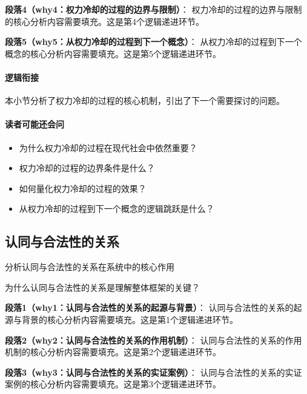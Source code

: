 \documentclass[../main.tex]{subfiles}
\begin{document}
\textbf{段落4（why4：权力冷却的过程的边界与限制）}：
权力冷却的过程的边界与限制的核心分析内容需要填充。这是第4个逻辑递进环节。


\textbf{段落5（why5：从权力冷却的过程到下一个概念）}：
从权力冷却的过程到下一个概念的核心分析内容需要填充。这是第5个逻辑递进环节。


\paragraph*{逻辑衔接}
本小节分析了权力冷却的过程的核心机制，引出了下一个需要探讨的问题。

\paragraph*{读者可能还会问}
\begin{itemize}
\item 为什么权力冷却的过程在现代社会中依然重要？
\item 权力冷却的过程的边界条件是什么？
\item 如何量化权力冷却的过程的效果？
\item 从权力冷却的过程到下一个概念的逻辑跳跃是什么？
\end{itemize}


\subsection{认同与合法性的关系}

\begin{motivation}
分析认同与合法性的关系在系统中的核心作用
\end{motivation}

\begin{logicmap}
[逻辑链占位]
\end{logicmap}

\begin{questionbox}
为什么认同与合法性的关系是理解整体框架的关键？
\end{questionbox}

\textbf{段落1（why1：认同与合法性的关系的起源与背景）}：
认同与合法性的关系的起源与背景的核心分析内容需要填充。这是第1个逻辑递进环节。


\textbf{段落2（why2：认同与合法性的关系的作用机制）}：
认同与合法性的关系的作用机制的核心分析内容需要填充。这是第2个逻辑递进环节。


\textbf{段落3（why3：认同与合法性的关系的实证案例）}：
认同与合法性的关系的实证案例的核心分析内容需要填充。这是第3个逻辑递进环节。
\end{document}
